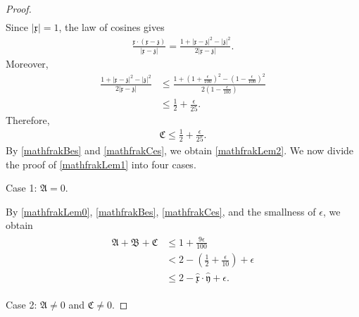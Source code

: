 \documentclass[10pt,a4paper]{amsart}
\numberwithin{equation}{section}
\begin{document}
\begin{proof}
\begin{align*}
\end{align*}
Since $|\mathfrak{x}|=1$, the law of cosines gives
\begin{align*}
\frac{\mathfrak{x}\cdot(\mathfrak{x}-\mathfrak{z})}
{|\mathfrak{x}-\mathfrak{z}|}
=
\frac{1+|\mathfrak{x}-\mathfrak{z}|^2-|\mathfrak{z}|^2}
{2|\mathfrak{x}-\mathfrak{z}|}.
\end{align*}
Moreover,
\begin{align*}
\frac{1+|\mathfrak{x}-\mathfrak{z}|^2-|\mathfrak{z}|^2}
{2|\mathfrak{x}-\mathfrak{z}|}
&\leq
\frac{1+\left(1+\frac{\epsilon}{100}\right)^2
-\left(1-\frac{\epsilon}{100}\right)^2}
{2\left(1-\frac{\epsilon}{100}\right)}
\\
&\leq
\frac{1}{2}+\frac{\epsilon}{25}.
\end{align*}
Therefore,
\begin{align}\label{mathfrakCes}
\mathfrak{C}\leq \frac{1}{2}+\frac{\epsilon}{25}.
\end{align}
By \eqref{mathfrakBes} and \eqref{mathfrakCes}, we obtain \eqref{mathfrakLem2}. We now divide the proof of \eqref{mathfrakLem1} into four cases.

Case 1: $\mathfrak{A}=0$.

By \eqref{mathfrakLem0}, \eqref{mathfrakBes}, \eqref{mathfrakCes}, and the smallness of $\epsilon$, we obtain
\begin{align}\label{mathfrakCase1}
\begin{aligned}
\mathfrak{A}+\mathfrak{B}+\mathfrak{C}&\leq 1+\frac{9\epsilon}{100}
\\
&< 2-\left(\frac{1}{2}+\frac{\epsilon}{10}\right)+\epsilon
\\
&\leq 2-\hat{\mathfrak{x}}\cdot \hat{\mathfrak{y}}+\epsilon.
\end{aligned}
\end{align}

Case 2: $\mathfrak{A}\neq 0$ and $\mathfrak{C}\neq 0$.


\end{proof}
\end{document}
